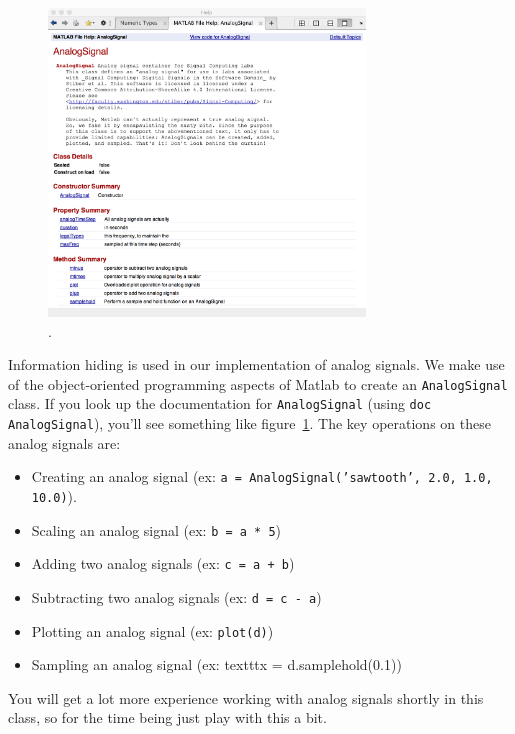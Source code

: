 \begin{figure}
\begin{center}
\includegraphics[width=0.75\textwidth]{lab1/AnalogSignal-help}
\end{center}
\caption{.\label{fg:analogsignal-help}}
\end{figure}

Information hiding is used in our implementation of analog signals. We
make use of the object-oriented programming aspects of Matlab to
create an \texttt{AnalogSignal} class. If you look up the documentation
for \texttt{AnalogSignal} (using \texttt{doc AnalogSignal}), you'll
see something like figure~\ref{fg:analogsignal-help}. The key
operations on these analog signals are:
\begin{itemize}
\item Creating an analog signal (ex: \texttt{a =
    AnalogSignal('sawtooth', 2.0, 1.0, 10.0)}).
\item Scaling an analog signal (ex: \texttt{b = a * 5})
\item Adding two analog signals (ex: \texttt{c = a + b})
\item Subtracting two analog signals (ex: \texttt{d = c - a})
\item Plotting an analog signal (ex: \texttt{plot(d)})
\item Sampling an analog signal (ex: texttt{x = d.samplehold(0.1)})
\end{itemize}

You will get a lot more experience working with analog signals shortly
in this class, so for the time being just play with this a bit.

